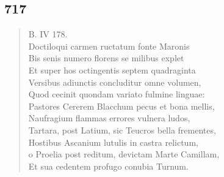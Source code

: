 \documentclass[11pt, a4paper]{report}
\begin{document}
            \subsection*{717}
      \begin{verse}
      B. IV 178. \\ Doctiloqui carmen ructatum fonte Maronis \\ Bis senis numero florens se milibus explet \\ Et super hos octingentis septem quadraginta \\ Versibus adiunctis concluditur omne volumen, \\ Quod cecinit quondam variato fulmine linguae: \\ Pastores Cererem Blacchum pecus et bona mellis, \\ Naufragium flammas errores vulnera ludos, \\ Tartara, post Latium, sic Teucros bella frementes, \\ Hostibus Ascanium lutulis in castra relictum, \\ o Proelia post reditum, devictam Marte Camillam, \\ Et sua cedentem profugo conubia Turnum. \\ 
      \end{verse}
  
\end{document}
